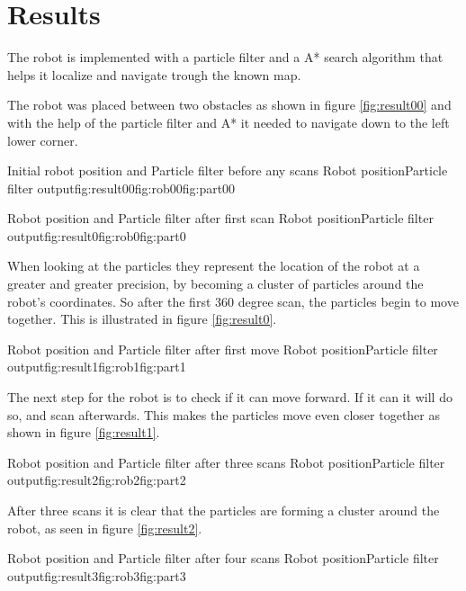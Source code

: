 \chapter{Results}
\label{chp:resul}

The robot is implemented with a particle filter and a A* search algorithm that helps it localize and navigate trough the known map. 


The robot was placed between two obstacles as shown in figure \ref{fig:result00} and with the help of the particle filter and A* it needed to navigate down to the left lower corner. 

{Initial robot position and Particle filter before any scans}
{Robot position}{Particle filter output}{fig:result00}{fig:rob00}{fig:part00}


{Robot position and Particle filter after first scan}
{Robot position}{Particle filter output}{fig:result0}{fig:rob0}{fig:part0}

\FloatBarrier
When looking at the particles they represent the location of the robot at a greater and greater precision, by becoming a cluster of particles around the robot's coordinates. So after the first 360 degree scan, the particles begin to move together. This is illustrated in figure \ref{fig:result0}.


{Robot position and Particle filter after first move}
{Robot position}{Particle filter output}{fig:result1}{fig:rob1}{fig:part1}

The next step for the robot is to check if it can move forward. If it can it will do so, and scan afterwards. This makes the particles move even closer together as shown in figure \ref{fig:result1}.


{Robot position and Particle filter after three scans}
{Robot position}{Particle filter output}{fig:result2}{fig:rob2}{fig:part2}

\FloatBarrier
After three scans it is clear that the particles are forming a cluster around the robot, as seen in figure \ref{fig:result2}. 


{Robot position and Particle filter after four scans}
{Robot position}{Particle filter output}{fig:result3}{fig:rob3}{fig:part3}

